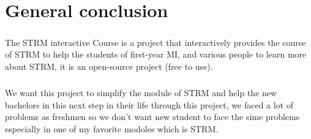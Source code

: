 \chapter*{General conclusion}
\lhead{}


\paragraph{}
The STRM interactive Course is a project that interactively provides the course of STRM to help the students of
 first-year MI, and various people to learn more about STRM, it is an open-source project (free to use).
\paragraph{}
We want this project to simplify the module of STRM and help the new bachelors in this next step in their life
through this project, we faced a lot of problems as freshmen so we don't want new student to face the sime problems especially in one of my favorite modoles which is STRM.